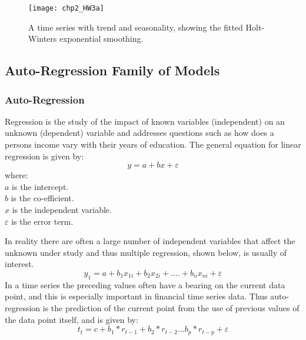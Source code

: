 
\begin{figure}[tbph!]
\centering
\texttt{[image: chp2\_HW3a]}
\caption[Exponential smoothing of a time series with trend and seasonality]{A time series with trend and seasonality, showing the fitted Holt-Winters exponential smoothing.}
\label{fig:HW3a}
\end{figure}



\subsection{Auto-Regression Family of Models}

\subsubsection{Auto-Regression}
\label{sec:autoregression}
Regression is the study of the impact of known variables (independent) on an unknown (dependent) variable and addresses questions such as how does a persons income vary with their years of education. The general equation for linear regression is given by:
\[ y = a + bx + \varepsilon \]
where:\\
$ a $ is the intercept.\\
$ b $ is the co-efficient.\\
$ x $ is the independent variable.\\
$ \varepsilon $ is the error term.

In reality there are often a large number of independent variables that affect the unknown under study and thus multiple regression, shown below, is usually of interest.
\[ y_{1} = a + b_{1}x_{1i} + b_{2}x_{2i} +  ....   +b_{n}x_{ni} + \varepsilon\]
In a time series the preceding values often have a bearing on the current data point, and this is especially important in financial time series data. Thus auto-regression is the prediction of the current point from the use of previous values of the data point itself, and is given by:
\[ t_{t}=c+b_{1}*r_{t-1}+b_{2}*r_{t-2}...b_{p}*r_{t-p}+ \varepsilon \]

